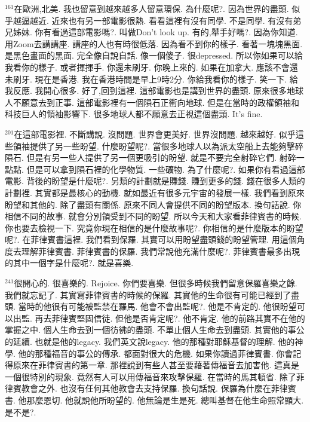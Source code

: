\documentclass{book}
\begin{document}
$^{161}$在歐洲,北美.
我也留意到越來越多人留意環保.
為什麼呢?.
因為世界的盡頭.
似乎越逼越近.
近來也有另一部電影很熱.
看看這裡有沒有同學.
不是同學.
有沒有弟兄姊妹.
你有看過這部電影嗎?.
叫做Don't look up.
有的,舉手好嗎?.
因為你知道.
用Zoom去講講座.
講座的人也有時很低落.
因為看不到你的樣子.
看著一塊塊黑面.
是黑色畫面的黑面.
完全像自說自話.
像一個傻子.
很depressed.
所以你如果可以給我看你的樣子.
或者揮揮手.
你還未刷牙.
你晚上來的.
如果在加拿大.
應該不會還未刷牙.
現在是香港.
我在香港時間是早上9時2分.
你給我看你的樣子.
笑一下.
給我反應.
我開心很多.
好了,回到這裡.
這部電影也是講到世界的盡頭.
原來很多地球人不願意去到正事.
這部電影裡有一個隕石正衝向地球.
但是在當時的政權領袖和科技巨人的領袖影響下.
很多地球人都不願意去正視這個盡頭.
It's fine.

$^{201}$在這部電影裡.
不斷講說.
沒問題.
世界會更美好.
世界沒問題.
越來越好.
似乎這些領袖提供了另一些盼望.
什麼盼望呢?.
當很多地球人以為派太空船上去能夠擊碎隕石.
但是有另一些人提供了另一個更吸引的盼望.
就是不要完全射碎它們.
射碎一點點.
但是可以拿到隕石裡的化學物質.
一些礦物.
為了什麼呢?.
如果你有看過這部電影.
背後的盼望是什麼呢?.
另類的計劃就是賺錢.
賺到更多的錢.
錢在很多人類的計劃裡.
其實都是最核心的動機.
就如最近有很多元宇宙的發展一樣.
我們看到原來盼望和其他的.
除了盡頭有關係.
原來不同人會提供不同的盼望版本.
換句話說.
你相信不同的故事.
就會分別領受到不同的盼望.
所以今天和大家看菲律賓書的時候.
你也要去檢視一下.
究竟你現在相信的是什麼故事呢?.
你相信的是什麼版本的盼望呢?.
在菲律賓書這裡.
我們看到保羅.
其實可以用盼望盡頭錢的盼望管理.
用這個角度去理解菲律賓書.
菲律賓書的保羅.
我們常說他充滿什麼呢?.
菲律賓書最多出現的其中一個字是什麼呢?.
就是喜樂.

$^{241}$很開心的.
很喜樂的.
Rejoice.
你們要喜樂.
但很多時候我們留意保羅喜樂之餘.
我們就忘記了.
其實寫菲律賓書的時候的保羅.
其實他的生命很有可能已經到了盡頭.
當時的他很有可能被監禁在羅馬.
他會不會出監呢?.
他是不肯定的.
他很盼望可以出監.
再去菲律賓堅固信徒.
但他是否肯定呢?.
他不肯定.
他的前路其實不在他的掌握之中.
個人生命去到一個彷彿的盡頭.
不單止個人生命去到盡頭.
其實他的事公的延續.
也就是他的legacy.
我們英文說legacy.
他的那種對耶穌基督的理解.
他的神學.
他的那種福音的事公的傳承.
都面對很大的危機.
如果你讀過菲律賓書.
你會記得原來在菲律賓書的第一章.
那裡說到有些人甚至要藉著傳福音去加害他.
這真是一個很特別的現象.
竟然有人可以用傳福音來攻擊保羅.
在當時的馬其頓省.
除了菲律賓教會之外.
也沒有任何其他教會去支持保羅.
換句話說.
保羅為什麼在菲律賓書.
他那麼恩切.
他就說他所盼望的.
他無論是生是死.
總叫基督在他生命照常顯大.
是不是?.
\end{document}

